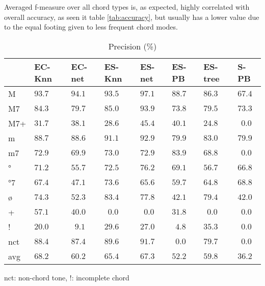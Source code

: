 \documentclass{article}
\begin{document}
Averaged f-measure over all chord types is, as expected, highly
correlated with overall accuracy, as seen it table \ref{tab:accuracy},
but usually has a lower value due to the equal footing given to less
frequent chord modes.

\begin{table}
  \centering
  \begin{tabular}{l|p{.5cm}p{.5cm}p{.5cm}p{.5cm}p{.5cm}p{.5cm}p{.5cm}}
   & EC-Knn&EC-net &ES-Knn &ES-net &ES-PB  &ES-tree&S-PB     \\
\hline                                             
M  &$93.7 $&$ 94.1$&$ 93.5$&$ \mathbf{97.1}$&$ 88.7$&$ 86.3$&$ 67.4$  \\
M7 &$84.3 $&$ 79.7$&$ 85.0$&$ \mathbf{93.9}$&$ 73.8$&$ 79.5$&$ 73.3$  \\
M7+&$31.7 $&$ 38.1$&$ 28.6$&$ \mathbf{45.4}$&$ 40.1$&$ 24.8$&$~~0.0$  \\
m  &$88.7 $&$ 88.6$&$ 91.1$&$ \mathbf{92.9}$&$ 79.9$&$ 83.0$&$ 79.9$  \\
m7 &$72.9 $&$ 69.9$&$ 73.0$&$ 72.9$&$ \mathbf{83.9}$&$ 68.8$&$~~0.0$  \\
°  &$71.2 $&$ 55.7$&$ 72.5$&$ \mathbf{76.2}$&$ 69.1$&$ 56.7$&$ 66.8$  \\
°7 &$67.4 $&$ 47.1$&$ \mathbf{73.6}$&$ 65.6$&$ 59.7$&$ 64.8$&$ 68.8$  \\
ø  &$74.3 $&$ 52.3$&$ \mathbf{83.4}$&$ 77.8$&$ 42.1$&$ 79.4$&$ 42.0$  \\
+  &$57.1 $&$ 40.0$&$~~0.0$&$~~0.0$&$ 31.8$&$~~0.0$&$~~0.0$  \\
!  &$20.0 $&$~~9.1$&$ 29.6$&$ 27.0$&$~~4.8$&$ \mathbf{35.3}$&$~~0.0$  \\
nct&$88.4 $&$ 87.4$&$ 89.6$&$ \mathbf{91.7}$&$~~0.0$&$ 79.7$&$~~0.0$  \\
avg&$\mathbf{68.2} $&$ 60.2$&$ 65.4$&$ 67.3$&$ 52.2$&$ 59.8$&$ 36.2$  \\

  \end{tabular}

\medskip

nct: non-chord tone, !: incomplete chord

  \caption{Precision (\%)}
  \label{tab:precision}
\end{table}
\end{document}
